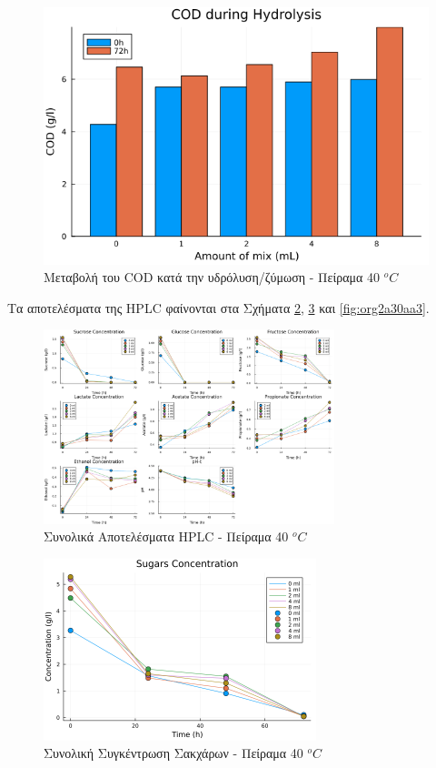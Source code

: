 \documentclass[11pt]{report}
\begin{document}
\begin{enumerate}
\pagebreak

\begin{figure}[htbp]
\centering
\includegraphics[width=.9\linewidth]{../plots/28_11/cod_groupedbar_28_11.png}
\caption{\label{fig:org6efd6ed}Μεταβολή του COD κατά την υδρόλυση/ζύμωση - Πείραμα 40 \(^oC\)}
\end{figure}

Τα αποτελέσματα της HPLC φαίνονται στα Σχήματα \ref{fig:orga70a748}, \ref{fig:orgf561c69} και \ref{fig:org2a30aa3}.

\begin{figure}[htbp]
\centering
\includegraphics[width=320px]{../plots/28_11/final_scatter_28_11.png}
\caption{\label{fig:orga70a748}Συνολικά Αποτελέσματα HPLC - Πείραμα 40 \(^oC\)}
\end{figure}

\pagebreak

\begin{figure}[htbp]
\centering
\includegraphics[width=300px]{../plots/28_11/sugars_conc_scatter_28_11.png}
\caption{\label{fig:orgf561c69}Συνολική Συγκέντρωση Σακχάρων - Πείραμα 40 \(^oC\)}
\end{figure}


\end{enumerate}
\end{document}
